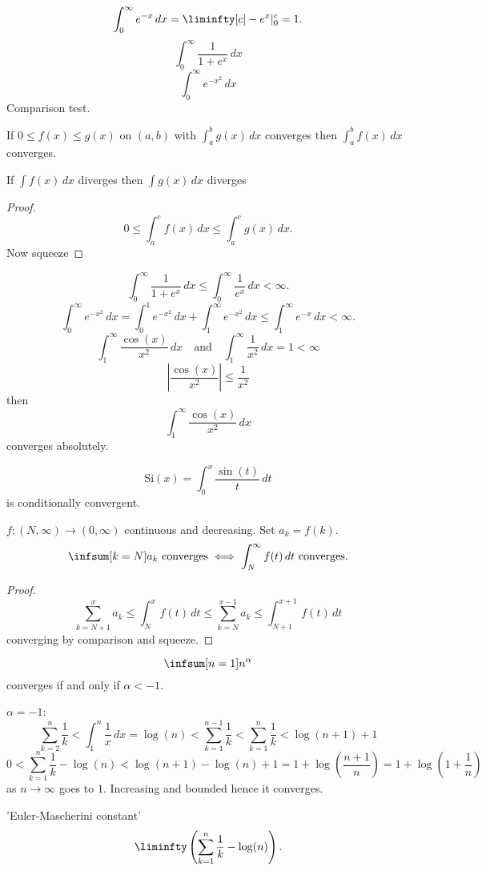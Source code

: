 \documentclass[10pt, a4paper]{article}
\begin{document}
\[
\int_{0}^{\infty}e ^ {-x}\,dx = \liminfty[c]-e ^ x|_{0}^{c} = 1.
\]
\[
\int_{0}^{\infty}\frac{1}{1 + e ^ x}\,dx
\]
\[
\int_{0}^{\infty}e ^ {-x ^ 2}\,dx
\]
Comparison test.

If $0 \leq f(x) \leq g(x)$ on $(a, b)$ with $\int_{a}^{b}g(x)\,dx$ converges then $\int_{a}^{b}f(x)\,dx$ converges.

If $\int f(x)\,dx$ diverges then $\int g(x)\,dx$ diverges

\begin{proof}
    \[
    0 \leq \int_{a}^{c}f(x)\,dx \leq \int_{a}^{c}g(x)\,dx.
    \]
    Now squeeze
\end{proof}
\[
\int_{0}^{\infty}\frac{1}{1 + e ^ x}\,dx \leq \int_{0}^{\infty}\frac{1}{e ^ x}\,dx < \infty.
\]
\[
\int_{0}^{\infty}e ^ {-x ^ 2}\,dx = \int_{0}^{1}e ^ {-x ^ 2}\,dx + \int_{1}^{\infty}e ^ {-x ^ 2}\,dx \leq \int_{1}^{\infty}e ^ {-x}\,dx < \infty.
\]
\[
\int_{1}^{\infty}\frac{\cos(x)}{x ^ 2}\,dx\quad\text{and}\quad\int_{1}^{\infty}\frac{1}{x ^ 2}\,dx = 1 < \infty
\]
\[
\left|\frac{\cos(x)}{x ^ 2}\right| \leq \frac{1}{x ^ 2}
\]
then
\[
\int_{1}^{\infty}\frac{\cos(x)}{x ^ 2}\,dx
\]
converges absolutely.

\[
\mathrm{Si}(x) = \int_{0}^{x}\frac{\sin(t)}{t}\,dt
\]
is conditionally convergent.

\begin{theorem}
    $f : (N, \infty) \to (0, \infty)$ continuous and decreasing.
    Set $a_k = f(k)$.
    \[
    \infsum[k = N]a_k\text{ converges} \iff \int_{N}^{\infty}f(t)\,dt\text{ converges}.
    \]

    \begin{proof}
        \[
        \sum_{k = N + 1}^{x}a_k \leq \int_{N}^{x}f(t)\,dt \leq \sum_{k = N}^{x - 1}a_k \leq \int_{N + 1}^{x + 1}f(t)\,dt
        \]
        converging by comparison and squeeze.
    \end{proof}
\end{theorem}

\begin{corollary}
    \[
    \infsum[n = 1]n ^ {\alpha}
    \]
    converges if and only if $\alpha < -1$.
\end{corollary}

$\alpha = -1$:
\[
\sum_{k = 2}^{n}\frac{1}{k} < \int_{1}^{n}\frac{1}{x}\,dx = \log(n) < \sum_{k = 1}^{n - 1}\frac{1}{k} < \sum_{k = 1}^{n}\frac{1}{k} < \log(n + 1) + 1
\]
\[
0 < \sum_{k = 1}^{n}\frac{1}{k} - \log(n) < \log(n + 1) - \log(n) + 1 = 1 + \log\left(\frac{n + 1}{n}\right) = 1 + \log\left(1 + \frac{1}{n}\right)
\]
as $n \to \infty$ goes to $1$.
Increasing and bounded hence it converges.

'Euler-Mascherini constant'
\[
\liminfty\left(\sum_{k = 1}^{n}\frac{1}{k} - \log(n)\right).
\]
\end{document}
